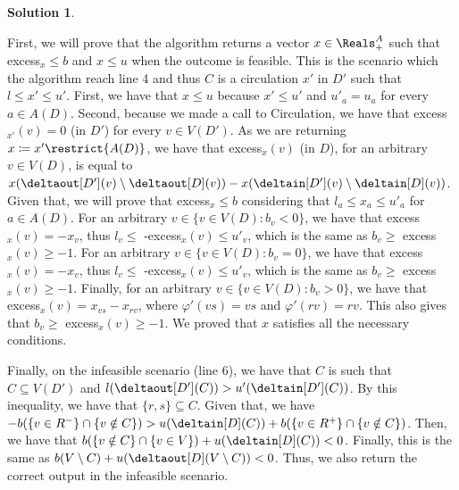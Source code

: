 \documentclass[11pt,leqno,final]{amsart}
\theoremstyle{definition}
\newtheorem{solution}{Solution}
\begin{document}
\begin{solution}
\begin{algorithm}
\begin{algorithmic}[1]
    \end{algorithmic}
  \end{algorithm}
    First, we will prove that the algorithm returns a vector $x \in \Reals^{A}_{+}$ such that excess$_x \leq b$ and $x \leq u$ when the outcome is feasible. This is the scenario which the algorithm reach line 4 and thus $C$ is a circulation $x'$ in $D'$ such that $l \leq x' \leq u'$. First, we have that $x \leq u$ because $x' \leq u'$ and $u'_a = u_a$ for every $a \in A(D)$. Second, because we made a call to Circulation, we have that excess$_{x'}(v) = 0$ (in $D'$) for every $v \in V(D')$. As we are returning $x \coloneqq x' \restrict{A(D)}$, we have that excess$_x(v)$ (in $D$), for an arbitrary $v \in V(D)$, is equal to $x(\deltaout[D'](v) \setminus \deltaout[D](v)) - x(\deltain[D'](v) \setminus \deltain[D](v))$. Given that, we will prove that excess$_x \leq b$ considering that $l_a \leq x_a \leq u'_a$ for $a \in A(D)$. For an arbitrary $v \in \{v \in V(D): b_v < 0\}$, we have that excess$_x(v) = -x_v$, thus $l_v \leq$ -excess$_x(v) \leq u'_v$, which is the same as $b_v \geq$ excess$_x(v) \geq -\mathcal{1}$. For an arbitrary $v \in \{v \in V(D): b_v = 0\}$, we have that excess$_x(v) = -x_v$, thus $l_v \leq$ -excess$_x(v) \leq u'_v$, which is the same as $b_v \geq$ excess$_x(v) \geq -\mathcal{1}$. Finally, for an arbitrary $v \in \{v \in V(D): b_v > 0\}$, we have that excess$_x(v) = x_{vs} - x_{rv}$, where $\varphi'(vs) = vs$ and $\varphi'(rv) = rv$. This also gives that $b_v \geq$ excess$_x(v) \geq -\mathcal{1}$. We proved that $x$ satisfies all the necessary conditions.

    Finally, on the infeasible scenario (line 6), we have that $C$ is such that $C \subseteq V(D')$ and $l(\deltaout[D'](C)) > u'(\deltain[D'](C))$. By this inequality, we have that $\{r,s\} \subseteq C$. Given that, we have $-b(\{v \in R^{-}\} \cap \{v \notin C\}) > u(\deltain[D](C)) + b(\{v \in R^{+}\} \cap \{v \notin C\})$. Then, we have that $b(\{v \notin C\} \cap \{v \in V\}) + u(\deltain[D](C)) < 0$. Finally, this is the same as $b(V \setminus C) + u(\deltaout[D](V \setminus C)) < 0$. Thus, we also return the correct output in the infeasible scenario.

\end{solution}
\end{document}
